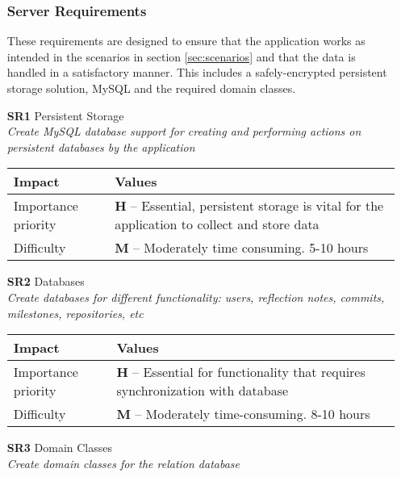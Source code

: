 \begin{itemize}
\subsubsection{Server Requirements}
These requirements are designed to ensure that the application works as intended in the scenarios in section \ref{sec:scenarios} and that the data is handled in a satisfactory manner. This includes a safely-encrypted persistent storage solution, MySQL and the required domain classes. 
    \item[\textbf{SR1}] Persistent Storage\\
        \textit{\small{Create MySQL database support for creating and performing actions on persistent databases by the application}}

        \begin{tabular}{| l | p{7cm} |}
            \hline
            \rowcolor[gray]{0.8}
            \textbf{Impact} & \textbf{Values} \\
            \hline
            Importance priority & \textbf{H} -- Essential, persistent storage is vital for the application to collect and store data\\
            Difficulty & \textbf{M} -- Moderately time consuming. 5-10 hours\\
            \hline
        \end{tabular}
    \vspace{0.5cm}

    \item[\textbf{SR2}] Databases\\
        \textit{\small{Create databases for different functionality: users, reflection notes, commits, milestones, repositories, etc}}

        \begin{tabular}{| l | p{7cm} |}
            \hline
            \rowcolor[gray]{0.8}
            \textbf{Impact} & \textbf{Values} \\
            \hline
            Importance priority & \textbf{H} -- Essential for functionality that requires synchronization with database\\
            Difficulty & \textbf{M} -- Moderately time-consuming. 8-10 hours\\
            \hline
        \end{tabular}
    \vspace{0.5cm}

    \item[\textbf{SR3}] Domain Classes\\
        \textit{\small{Create domain classes for the relation database}}


\end{itemize}
